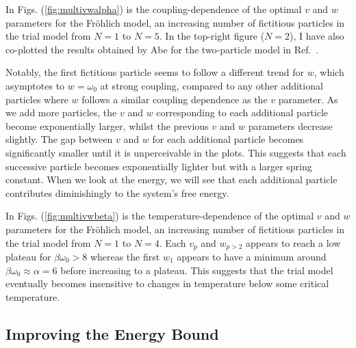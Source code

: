 In Figs. (\ref{fig:multivwalpha}) is the coupling-dependence of the optimal $v$ and $w$ parameters for the Fr\"ohlich model, an increasing number of fictitious particles in the trial model from $N=1$ to $N=5$. In the top-right figure ($N=2$), I have also co-plotted the results obtained by Abe for the two-particle model in Ref.~\cite{abe_improvement_1971}. 

Notably, the first fictitious particle seems to follow a different trend for $w$, which asymptotes to $w = \omega_0$ at strong coupling, compared to any other additional particles where $w$ follows a similar coupling dependence as the $v$ parameter. As we add more particles, the $v$ and $w$ corresponding to each additional particle become exponentially larger, whilst the previous $v$ and $w$ parameters decrease slightly. The gap between $v$ and $w$ for each additional particle becomes significantly smaller until it is unperceivable in the plots. This suggests that each successive particle becomes exponentially lighter but with a larger spring constant. When we look at the energy, we will see that each additional particle contributes diminishingly to the system's free energy.

In Figs. (\ref{fig:multivwbeta}) is the temperature-dependence of the optimal $v$ and $w$ parameters for the Fr\"ohlich model, an increasing number of fictitious particles in the trial model from $N=1$ to $N=4$. Each $v_p$ and $w_{p>2}$ appears to reach a low plateau for $\beta \omega_0 > 8$ whereas the first $w_1$ appears to have a minimum around $\beta\omega_0 \approx \alpha = 6$ before increasing to a plateau. This suggests that the trial model eventually becomes insensitive to changes in temperature below some critical temperature.

\subsection{Improving the Energy Bound}

